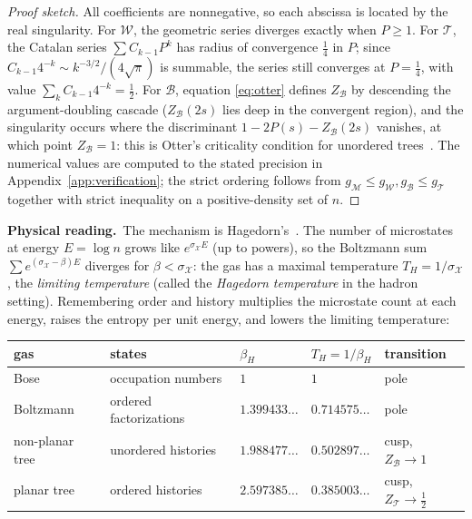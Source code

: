 \documentclass[11pt]{article}
\newcommand{\cT}{\mathcal{T}}   %
\newcommand{\cW}{\mathcal{W}}   %
\newcommand{\cB}{\mathcal{B}}   %
\newcommand{\cM}{\mathcal{M}}   %
\newcommand{\physread}{\medskip\noindent\textbf{Physical reading.}\ }
\numberwithin{equation}{section}
\theoremstyle{plain}
\theoremstyle{definition}
\theoremstyle{remark}
\begin{document}
\begin{proof}[Proof sketch]
All coefficients are nonnegative, so each abscissa is located by the real singularity.
For $\cW$, the geometric series diverges exactly when $P \ge 1$. For $\cT$, the
Catalan series $\sum C_{k-1}P^k$ has radius of convergence $\tfrac14$ in $P$; since
$C_{k-1}4^{-k} \sim k^{-3/2}/(4\sqrt{\pi})$ is summable, the series still converges at
$P = \tfrac14$, with value $\sum_k C_{k-1}4^{-k} = \tfrac12$. For $\cB$, equation
\eqref{eq:otter} defines $Z_\cB$ by descending the argument-doubling cascade
($Z_\cB(2s)$ lies deep in the convergent region), and the singularity occurs where the
discriminant $1 - 2P(s) - Z_\cB(2s)$ vanishes, at which point $Z_\cB = 1$: this is
Otter's criticality condition for unordered trees~\cite{otter,flajolet}. The numerical
values are computed to the stated precision in Appendix~\ref{app:verification}; the
strict ordering follows from $g_\cM \le g_\cW, g_\cB \le g_\cT$ together with strict
inequality on a positive-density set of $n$.
\end{proof}

\physread The mechanism is Hagedorn's~\cite{hagedorn}. The number of microstates at
energy $E = \log n$ grows like $e^{\sigma_{\mathcal X} E}$ (up to powers), so the
Boltzmann sum $\sum e^{(\sigma_{\mathcal X} - \beta)E}$ diverges for
$\beta < \sigma_{\mathcal X}$: the gas has a maximal temperature
$T_H = 1/\sigma_{\mathcal X}$, the \emph{limiting temperature} (called the
\emph{Hagedorn temperature} in the hadron setting). Remembering order and history
multiplies the microstate count at each energy, raises the entropy per unit energy,
and lowers the limiting temperature:

\begin{center}
\begin{tabular}{@{}lllll@{}}
\toprule
gas & states & $\beta_H$ & $T_H = 1/\beta_H$ & transition \\
\midrule
Bose & occupation numbers & $1$ & $1$ & pole \\
Boltzmann & ordered factorizations & $1.399433\dots$ & $0.714575\dots$ & pole \\
non-planar tree & unordered histories & $1.988477\dots$ & $0.502897\dots$ & cusp, $Z_\cB \to 1$ \\
planar tree & ordered histories & $2.597385\dots$ & $0.385003\dots$ & cusp, $Z_\cT \to \tfrac12$ \\
\bottomrule
\end{tabular}
\end{center}
\end{document}
